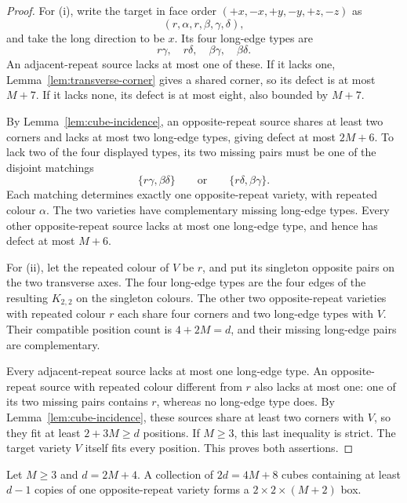 \begin{proof}
For (i), write the target in face order $(+x,-x,+y,-y,+z,-z)$ as
\[
 (r,\alpha,r,\beta,\gamma,\delta),
\]
and take the long direction to be $x$. Its four long-edge types are
\[
 r\gamma,\quad r\delta,\quad \beta\gamma,\quad \beta\delta.
\]
An adjacent-repeat source lacks at most one of these. If it lacks one,
Lemma~\ref{lem:transverse-corner} gives a shared corner, so its defect
is at most $M+7$. If it lacks none, its defect is at most eight, also
bounded by $M+7$.

By Lemma~\ref{lem:cube-incidence}, an opposite-repeat source shares at
least two corners and lacks at most
two long-edge types, giving defect at most $2M+6$. To lack two of the
four displayed types, its two missing pairs must be one of the disjoint
matchings
\[
 \{r\gamma,\beta\delta\}\qquad\text{or}\qquad\{r\delta,\beta\gamma\}.
\]
Each matching determines exactly one opposite-repeat variety, with
repeated colour $\alpha$. The two varieties have complementary missing
long-edge types. Every other opposite-repeat source lacks at most one
long-edge type, and hence has defect at most $M+6$.

For (ii), let the repeated colour of $V$ be $r$, and put its singleton
opposite pairs on the two transverse axes. The four long-edge types are
the four edges of the resulting $K_{2,2}$ on the singleton colours.
The other two opposite-repeat varieties with repeated colour $r$ each
share four corners and two long-edge types with $V$. Their compatible
position count is $4+2M=d$, and their missing long-edge pairs are
complementary.

Every adjacent-repeat source lacks at most one long-edge type. An
opposite-repeat source with repeated colour different from $r$ also
lacks at most one: one of its two missing pairs contains $r$, whereas
no long-edge type does. By Lemma~\ref{lem:cube-incidence}, these sources share at least two
corners with $V$, so they fit at least $2+3M\ge d$ positions. If $M\ge3$, this last
inequality is strict. The target variety $V$ itself fits every position.
This proves both assertions.
\end{proof}

\begin{lemma}\label{lem:rod-concentration}
Let $M\ge3$ and $d=2M+4$. A collection of $2d=4M+8$ cubes containing
at least $d-1$ copies of one opposite-repeat variety forms a
$2\times2\times(M+2)$ box.
\end{lemma}

